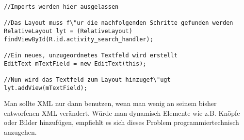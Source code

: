 \begin{lstlisting}
//Imports werden hier ausgelassen

//Das Layout muss f\"ur die nachfolgenden Schritte gefunden werden
RelativeLayout lyt = (RelativeLayout) findViewById(R.id.activity_search_handler);

//Ein neues, unzugeordnetes Textfeld wird erstellt
EditText mTextField = new EditText(this);

//Nun wird das Textfeld zum Layout hinzugef\"ugt
lyt.addView(mTextField);
\end{lstlisting}

Man sollte XML nur dann benutzen, wenn man wenig an seinem bisher entworfenen XML verändert. Würde man dynamisch Elemente wie z.B. Knöpfe oder Bilder hinzufügen, empfiehlt es sich dieses Problem programmiertechnisch anzugehen.